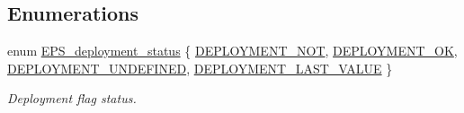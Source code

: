 \subsection*{Enumerations}
\begin{DoxyCompactItemize}
\item 
enum \hyperlink{group__eps__non__volatile__mem__handling_ga13e6db4835e4559cf9c14fa16822ca27}{E\-P\-S\-\_\-deployment\-\_\-status} \{ \hyperlink{group__eps__non__volatile__mem__handling_gga13e6db4835e4559cf9c14fa16822ca27af50a8eb390da80316f37e7d85f806478}{D\-E\-P\-L\-O\-Y\-M\-E\-N\-T\-\_\-\-N\-O\-T}, 
\hyperlink{group__eps__non__volatile__mem__handling_gga13e6db4835e4559cf9c14fa16822ca27a2ff32e07cd6090c24f1f837b9d5d8737}{D\-E\-P\-L\-O\-Y\-M\-E\-N\-T\-\_\-\-O\-K}, 
\hyperlink{group__eps__non__volatile__mem__handling_gga13e6db4835e4559cf9c14fa16822ca27af2897d42f16e0f537a5164f37634701b}{D\-E\-P\-L\-O\-Y\-M\-E\-N\-T\-\_\-\-U\-N\-D\-E\-F\-I\-N\-E\-D}, 
\hyperlink{group__eps__non__volatile__mem__handling_gga13e6db4835e4559cf9c14fa16822ca27a286e7f365766c8a3bae1723ad5b410a1}{D\-E\-P\-L\-O\-Y\-M\-E\-N\-T\-\_\-\-L\-A\-S\-T\-\_\-\-V\-A\-L\-U\-E}
 \}
\begin{DoxyCompactList}\small\item\em Deployment flag status. \end{DoxyCompactList}\end{DoxyCompactItemize}
